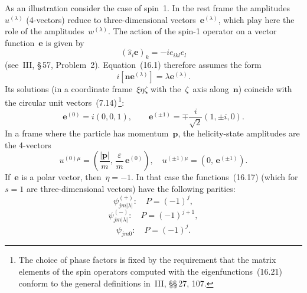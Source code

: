 As an illustration consider the case of spin~1. In the rest frame the amplitudes~$u^{(\lambda)}$ (4-vectors) reduce to three-dimensional vectors~$\mathbf{e}^{(\lambda)}$, which play here the role of the amplitudes~$w^{(\lambda)}$. The action of the spin-1 operator on a vector function~$\mathbf{e}$ is given by
\begin{equation}
(\hat{s}_i\mathbf{e})_k = -ie_{ikl}e_l
\tag{16.19}
\end{equation}
(see~III, \S\,57, Problem~2). Equation~(16.1) therefore assumes the form
\begin{equation}
i[\mathbf{n}\mathbf{e}^{(\lambda)}] = \lambda\mathbf{e}^{(\lambda)}.
\tag{16.20}
\end{equation}
Its solutions (in a coordinate frame~$\xi\eta\zeta$ with the~$\zeta$~axis along~$\mathbf{n}$) coincide with the circular unit vectors~(7.14)\,\footnote{The choice of phase factors is fixed by the requirement that the matrix elements of the spin operators computed with the eigenfunctions~(16.21) conform to the general definitions in~III, \S\S\,27, 107.}:
\begin{equation}
\mathbf{e}^{(0)} = i(0, 0, 1), \qquad \mathbf{e}^{(\pm 1)} = \mp\frac{i}{\sqrt{2}}(1, \pm i, 0).
\tag{16.21}
\end{equation}
In a frame where the particle has momentum~$\mathbf{p}$, the helicity-state amplitudes are the 4-vectors
\begin{equation}
u^{(0)\mu} = \left(\frac{|\mathbf{p}|}{m},\,\frac{\varepsilon}{m}\,\mathbf{e}^{(0)}\right), \quad u^{(\pm 1)\mu} = (0,\,\mathbf{e}^{(\pm 1)}).
\tag{16.22}
\end{equation}
If~$\mathbf{e}$ is a polar vector, then~$\eta = -1$. In that case the functions~(16.17) (which for~$s = 1$ are three-dimensional vectors) have the following parities:
\[
\psi^{(+)}_{jm|\lambda|}:\quad P = (-1)^j,
\]
\[
\psi^{(-)}_{jm|\lambda|}:\quad P = (-1)^{j+1},
\]
\[
\psi_{jm0}:\quad P = (-1)^j.
\]


